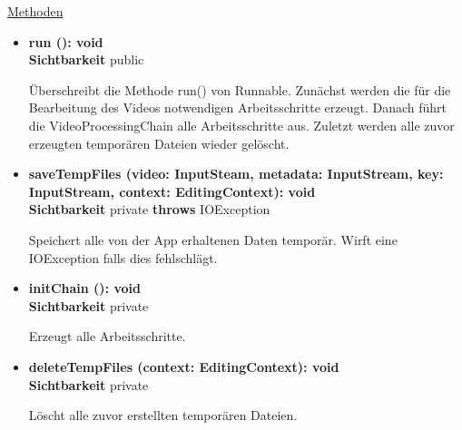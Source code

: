 \underline{Methoden}
\begin{itemize}
\itemsep0pt
\item \textbf{run (): void}\hfill\\
\textbf{Sichtbarkeit} public

Überschreibt die Methode run() von Runnable. Zunächst werden die für die Bearbeitung des Videos notwendigen Arbeitsschritte erzeugt. Danach führt die VideoProcessingChain alle Arbeitsschritte aus. Zuletzt werden alle zuvor erzeugten temporären Dateien wieder gelöscht.

\item \textbf{saveTempFiles (video: InputSteam, metadata: InputStream, 
key: InputStream, context: EditingContext): void}\hfill\\
\textbf{Sichtbarkeit} private \newline
\textbf{throws} IOException 

Speichert alle von der App erhaltenen Daten temporär. Wirft eine IOException falls dies fehlschlägt.

\item \textbf{initChain (): void}\hfill\\
\textbf{Sichtbarkeit} private

Erzeugt alle Arbeitsschritte.

\item \textbf{deleteTempFiles (context: EditingContext): void}\hfill\\
\textbf{Sichtbarkeit} private

Löscht alle zuvor erstellten temporären Dateien.

\end{itemize}